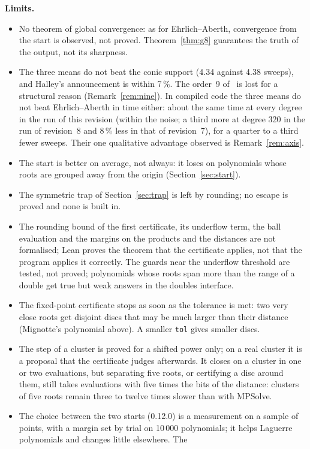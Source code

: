 \documentclass[10pt,a4paper]{article}
\theoremstyle{definition}
\numberwithin{equation}{section}
\begin{document}
\textbf{Limits.}
\begin{itemize}
\item No theorem of global convergence: as for Ehrlich--Aberth, convergence from the start
 is observed, not proved. Theorem~\ref{thm:g8} guarantees the truth of the output, not its
 sharpness.
\item The three means do not beat the conic support (4.34 against 4.38 sweeps), and Halley's
 announcement is within 7\,\%. The order~9 of~\cite{v29} is lost for a structural reason
 (Remark~\ref{rem:nine}). In compiled code the three means do not beat Ehrlich--Aberth in time either:
 about the same time at every degree in the run of this revision (within the noise; a third more at
 degree 320 in the run of revision~8 and 8\,\% less in that of revision~7), for a quarter to a third
 fewer sweeps. Their one
 qualitative advantage observed is Remark~\ref{rem:axis}.
\item The start is better on average, not always: it loses on polynomials whose roots are grouped
 away from the origin (Section~\ref{sec:start}).
\item The symmetric trap of Section~\ref{sec:trap} is left by rounding; no escape is proved and none
 is built in.
\item The rounding bound of the first certificate, its underflow term, the ball evaluation and the
 margins on the products and the distances are not formalised; Lean proves the theorem that the
 certificate applies, not that the program applies it correctly. The guards near the underflow
 threshold are tested, not proved; polynomials whose roots span more than the range of a double get
 true but weak answers in the doubles interface.
\item The fixed-point certificate stops as soon as the tolerance is met: two very close roots get
 disjoint discs that may be much larger than their distance (Mignotte's polynomial above). A smaller
 \texttt{tol} gives smaller discs.
\item The step of a cluster is proved for a shifted power only; on a real cluster it is a proposal that
 the certificate judges afterwards. It closes on a cluster in one or two evaluations, but separating
 five roots, or certifying a disc around them, still takes evaluations with five times the bits of the
 distance: clusters of five roots remain three to twelve times slower than with MPSolve.
\item The choice between the two starts (0.12.0) is a measurement on a sample of points, with a margin
 set by trial on 10\,000 polynomials; it helps Laguerre polynomials and changes little elsewhere. The

\end{itemize}
\end{document}
